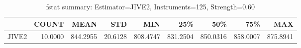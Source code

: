 \begin{table}[ht]
\centering
\caption{fstat summary: Estimator=JIVE2, Instruments=125, Strength=0.60}
\begin{tabular}{lrrrrrrrr}
\toprule
 & COUNT & MEAN & STD & MIN & 25\% & 50\% & 75\% & MAX \\
\midrule
JIVE2 & 10.0000 & 844.2955 & 20.6128 & 808.4747 & 831.2504 & 850.0316 & 858.0007 & 875.8941 \\
\bottomrule
\end{tabular}
\end{table}
